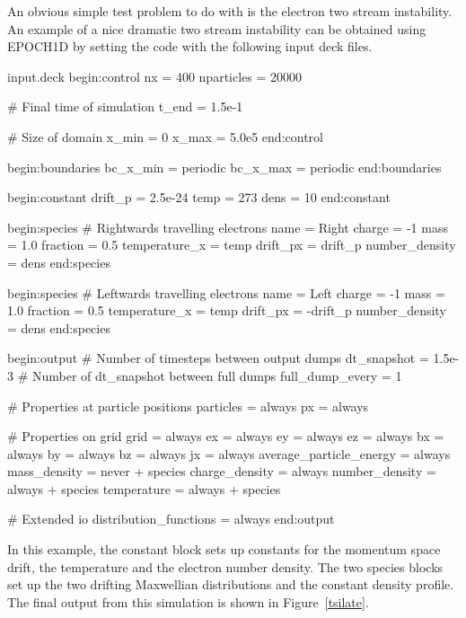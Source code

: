 An obvious simple test problem to do with {\EPOCH} is the electron two stream
instability. An example of a nice dramatic two stream instability can be
obtained using EPOCH1D by setting the code with the following input deck
files.\\
\begin{lboxverbatim}{input.deck}
begin:control
   nx = 400
   nparticles = 20000

   # Final time of simulation
   t_end = 1.5e-1

   # Size of domain
   x_min = 0
   x_max = 5.0e5
end:control


begin:boundaries
   bc_x_min = periodic
   bc_x_max = periodic
end:boundaries


begin:constant
   drift_p = 2.5e-24
   temp = 273
   dens = 10
end:constant


begin:species
   # Rightwards travelling electrons
   name = Right
   charge = -1
   mass = 1.0
   fraction = 0.5
   temperature_x = temp
   drift_px = drift_p
   number_density = dens
end:species


begin:species
   # Leftwards travelling electrons
   name = Left
   charge = -1
   mass = 1.0
   fraction = 0.5
   temperature_x = temp
   drift_px = -drift_p
   number_density = dens
end:species


begin:output
   # Number of timesteps between output dumps
   dt_snapshot = 1.5e-3
   # Number of dt_snapshot between full dumps
   full_dump_every = 1

   # Properties at particle positions
   particles = always
   px = always

   # Properties on grid
   grid = always
   ex = always
   ey = always
   ez = always
   bx = always
   by = always
   bz = always
   jx = always
   average_particle_energy = always
   mass_density = never + species
   charge_density = always
   number_density = always + species
   temperature = always + species

   # Extended io
   distribution_functions = always
end:output
\end{lboxverbatim}


In this example, the constant block sets up constants for the momentum space
drift, the temperature and the electron number density. The two species blocks
set up the two drifting Maxwellian distributions and the constant density
profile.
The final output from this simulation is shown in Figure~\ref{tsilate}.
\pagebreak

